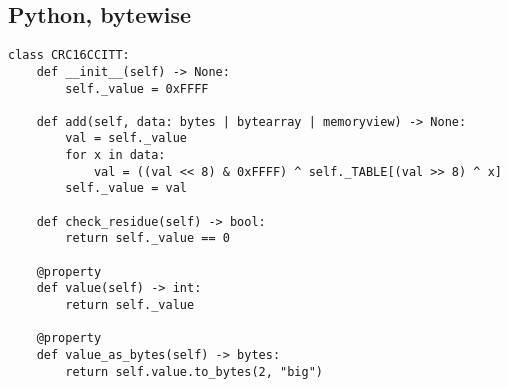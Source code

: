 \subsection{Python, bytewise}

\begin{samepage}
\begin{verbatim}
class CRC16CCITT:
    def __init__(self) -> None:
        self._value = 0xFFFF

    def add(self, data: bytes | bytearray | memoryview) -> None:
        val = self._value
        for x in data:
            val = ((val << 8) & 0xFFFF) ^ self._TABLE[(val >> 8) ^ x]
        self._value = val

    def check_residue(self) -> bool:
        return self._value == 0

    @property
    def value(self) -> int:
        return self._value

    @property
    def value_as_bytes(self) -> bytes:
        return self.value.to_bytes(2, "big")


\end{verbatim}
\end{samepage}
